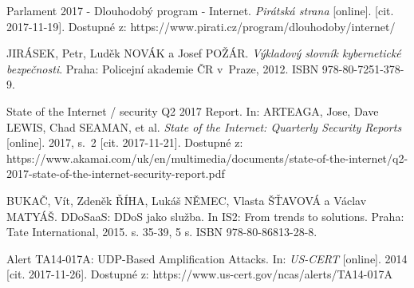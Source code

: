 

\begin{literatura}{99}

Parlament 2017 - Dlouhodobý program - Internet. \textit{Pirátská strana} [online]. [cit. 2017-11-19]. Dostupné z: https://www.pirati.cz/program/dlouhodoby/internet/

JIRÁSEK, Petr, Luděk NOVÁK a Josef POŽÁR. \textit{Výkladový slovník kybernetické bezpečnosti}. Praha: Policejní akademie ČR v~Praze, 2012. ISBN 978-80-7251-378-9.

State of the Internet / security Q2 2017 Report. In: ARTEAGA, Jose, Dave LEWIS, Chad SEAMAN, et al. \textit{State of the Internet: Quarterly Security Reports} [online]. 2017, s.~2 [cit. 2017-11-21]. Dostupné z: https://www.akamai.com/uk/en/multimedia/documents/state-of-the-internet/q2-2017-state-of-the-internet-security-report.pdf

BUKAČ, Vít, Zdeněk ŘÍHA, Lukáš NĚMEC, Vlasta ŠŤAVOVÁ a Václav MATYÁŠ. DDoSaaS: DDoS jako služba. In IS2: From trends to solutions. Praha: Tate International, 2015. s. 35-39, 5 s. ISBN 978-80-86813-28-8.

Alert TA14-017A: UDP-Based Amplification Attacks. In: \textit{US-CERT} [online]. 2014 [cit. 2017-11-26]. Dostupné z: https://www.us-cert.gov/ncas/alerts/TA14-017A

\end{literatura}


%
%
%
